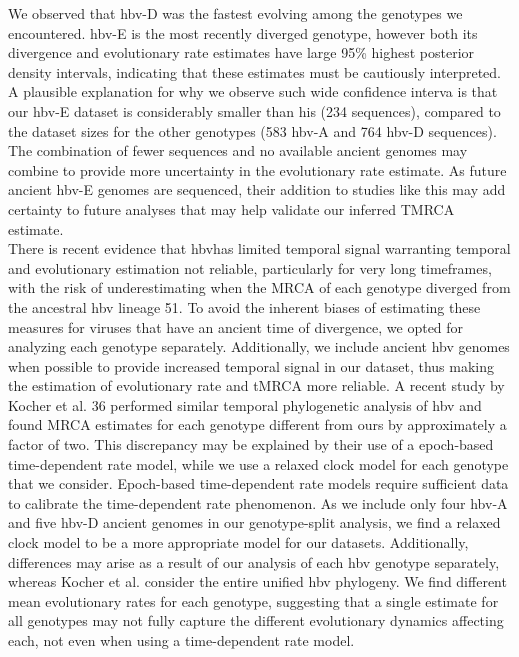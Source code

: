 We observed that \gls{hbv}-D was the fastest evolving among the genotypes we encountered. \gls{hbv}-E is the most recently diverged genotype, however both its divergence and evolutionary rate estimates have large 95\% highest posterior density intervals, indicating that these estimates must be cautiously interpreted. A plausible explanation for why we observe such wide confidence interva is that our \gls{hbv}-E dataset is considerably smaller than his (234 sequences), compared to the dataset sizes for the other genotypes (583 \gls{hbv}-A and 764 \gls{hbv}-D sequences). The combination of fewer sequences and no available ancient genomes may combine to provide more uncertainty in the evolutionary rate estimate. As future ancient \gls{hbv}-E genomes are sequenced, their addition to studies like this may add certainty to future analyses that may help validate our inferred TMRCA estimate.\\

There is recent evidence that \gls{hbv}has limited temporal signal warranting temporal and evolutionary estimation not reliable, particularly for very long timeframes, with the risk of underestimating when the MRCA of each genotype diverged from the ancestral \gls{hbv} lineage 51. To avoid the inherent biases of estimating these measures for viruses that have an ancient time of divergence, we opted for analyzing each genotype separately. Additionally, we include ancient \gls{hbv} genomes when possible to provide increased temporal signal in our dataset, thus making the estimation of evolutionary rate and tMRCA more reliable. A recent study by Kocher et al. 36 performed similar temporal phylogenetic analysis of \gls{hbv} and found MRCA estimates for each genotype different from ours by approximately a factor of two. This discrepancy may be explained by their use of a epoch-based time-dependent rate model, while we use a relaxed clock model for each genotype that we consider. Epoch-based time-dependent rate models require sufficient data to calibrate the time-dependent rate phenomenon. As we include only four \gls{hbv}-A and five \gls{hbv}-D ancient genomes in our genotype-split analysis, we find a relaxed clock model to be a more appropriate model for our datasets. Additionally, differences may arise as a result of our analysis of each \gls{hbv} genotype separately, whereas Kocher et al. consider the entire unified \gls{hbv} phylogeny. We find different mean evolutionary rates for each genotype, suggesting that a single estimate for all genotypes may not fully capture the different evolutionary dynamics affecting each, not even when using a time-dependent rate model.\\

